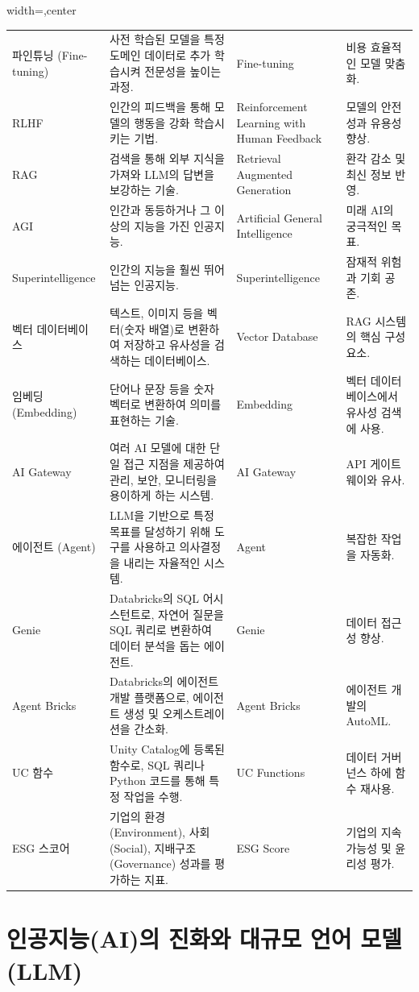 \documentclass[11pt,a4paper]{article}
\theoremstyle{definition}
\begin{document}
\begin{adjustbox}{width=\textwidth,center}
\begin{tabular}{llll}
파인튜닝 (Fine-tuning) & 사전 학습된 모델을 특정 도메인 데이터로 추가 학습시켜 전문성을 높이는 과정. & Fine-tuning & 비용 효율적인 모델 맞춤화. \\
RLHF & 인간의 피드백을 통해 모델의 행동을 강화 학습시키는 기법. & Reinforcement Learning with Human Feedback & 모델의 안전성과 유용성 향상. \\
RAG & 검색을 통해 외부 지식을 가져와 LLM의 답변을 보강하는 기술. & Retrieval Augmented Generation & 환각 감소 및 최신 정보 반영. \\
AGI & 인간과 동등하거나 그 이상의 지능을 가진 인공지능. & Artificial General Intelligence & 미래 AI의 궁극적인 목표. \\
Superintelligence & 인간의 지능을 훨씬 뛰어넘는 인공지능. & Superintelligence & 잠재적 위험과 기회 공존. \\
벡터 데이터베이스 & 텍스트, 이미지 등을 벡터(숫자 배열)로 변환하여 저장하고 유사성을 검색하는 데이터베이스. & Vector Database & RAG 시스템의 핵심 구성 요소. \\
임베딩 (Embedding) & 단어나 문장 등을 숫자 벡터로 변환하여 의미를 표현하는 기술. & Embedding & 벡터 데이터베이스에서 유사성 검색에 사용. \\
AI Gateway & 여러 AI 모델에 대한 단일 접근 지점을 제공하여 관리, 보안, 모니터링을 용이하게 하는 시스템. & AI Gateway & API 게이트웨이와 유사. \\
에이전트 (Agent) & LLM을 기반으로 특정 목표를 달성하기 위해 도구를 사용하고 의사결정을 내리는 자율적인 시스템. & Agent & 복잡한 작업을 자동화. \\
Genie & Databricks의 SQL 어시스턴트로, 자연어 질문을 SQL 쿼리로 변환하여 데이터 분석을 돕는 에이전트. & Genie & 데이터 접근성 향상. \\
Agent Bricks & Databricks의 에이전트 개발 플랫폼으로, 에이전트 생성 및 오케스트레이션을 간소화. & Agent Bricks & 에이전트 개발의 AutoML. \\
UC 함수 & Unity Catalog에 등록된 함수로, SQL 쿼리나 Python 코드를 통해 특정 작업을 수행. & UC Functions & 데이터 거버넌스 하에 함수 재사용. \\
ESG 스코어 & 기업의 환경(Environment), 사회(Social), 지배구조(Governance) 성과를 평가하는 지표. & ESG Score & 기업의 지속 가능성 및 윤리성 평가. \\
\bottomrule
\end{tabular}
\end{adjustbox}

\newpage
\section{인공지능(AI)의 진화와 대규모 언어 모델(LLM)}
\end{document}

